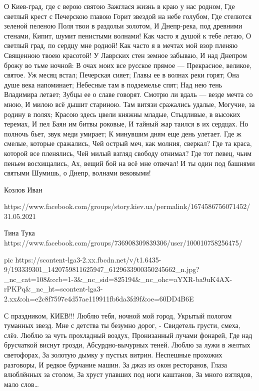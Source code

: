  
 
 
 
 

О Киев-град, где с верою святою
Зажглася жизнь в краю у нас родном,
Где светлый крест с Печерскою главою
Горит звездой на небе голубом,
Где стелются зеленой пеленою
Поля твои в раздольи золотом,
И Днепр-река, под древними стенами,
Кипит, шумит пенистыми волнами!
Как часто я душой к тебе летаю,
О светлый град, по сердцу мне родной!
Как часто я в мечтах мой взор пленяю
Священною твоею красотой!
У Лаврских стен земное забываю,
И над Днепром брожу во тьме ночной:
В очах моих все русское прямое —
Прекрасное, великое, святое.
Уж месяц встал; Печерская сияет;
Главы ее в волнах реки горят;
Она душе века напоминает;
Небесные там в подземелье спят;
Над нею тень Владимира летает;
Зубцы ее о славе говорят.
Смотрю ли вдаль — везде мечта со мною,
И милою всё дышит стариною.
Там витязи сражались удалые,
Могучие, за родину в полях;
Красою здесь цвели княжны младые,
Стыдливые, в высоких теремах,
И пел Баян им битвы роковые,
И тайный жар таился в их сердцах.
Но полночь бьет, звук меди умирает;
К минувшим дням еще день улетает.
Где ж смелые, которые сражались,
Чей острый меч, как молния, сверкал?
Где та краса, которой все пленялись,
Чей милый взгляд свободу отнимал?
Где тот певец, чьим пеньем восхищались,
Ах, вещий бой на всё мне отвечал!
И ты один под башнями святыми
Шумишь, о Днепр, волнами вековыми!

Козлов Иван

https://www.facebook.com/groups/story.kiev.ua/permalink/1674586756071452/
31.05.2021

Тина Тука
https://www.facebook.com/groups/736908309839306/user/100010758256475/

\ifcmt
  pic https://scontent-lga3-2.xx.fbcdn.net/v/t1.6435-9/193339301_1420759811625947_6129633900350245662_n.jpg?_nc_cat=108&ccb=1-3&_nc_sid=825194&_nc_ohc=aYXR-ba9uK4AX-rPKPq&_nc_ht=scontent-lga3-2.xx&oh=e2c8f7597e4d57ae119911fb6da3fd9f&oe=60DD4B6E
\fi

С праздником, КИЕВ!!!
Люблю тебя, ночной мой город,
Укрытый пологом туманных звезд.
Мне с детства ты безумно дорог, - 
Свидетель грусти, смеха, слёз.
Люблю за чуть прохладный воздух,
Пронизанный лучами фонарей, 
Где над брусчаткой виснут грозди,
Абсурдно-вычурных теней.
Люблю за лужи в желтых светофорах,
За золотую дымку у пустых витрин.
Неспешные прохожих разговоры,
И редкое бурчание машин.
За джаз из окон ресторанов,
Глаза влюблённых за столом,
За хруст упавших под ноги каштанов,
За много взглядов, мало слов…



